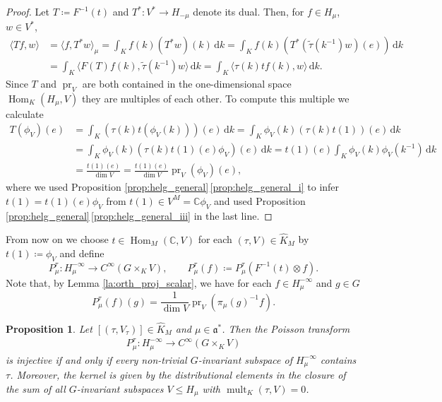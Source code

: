 \documentclass[JEP,XML,SOM,NoFloatCountersInSection,Unicode,published]{cedram}
\newtheorem{proposition}[theorem]{Proposition}
\theoremstyle{definition}
\newcommand{\mf}[1]{\ensuremath{\mathfrak{#1}}}
\newcommand{\on}[1]{\ensuremath{\operatorname{#1}}}
\newcommand{\Hom}[3]{\ensuremath{\on{Hom}_{#1}(#2,#3)}}
\newcommand{\C}{\ensuremath{\mathbb{C}}}
\newcommand{\pst}[1]{\ensuremath{H_{#1}}}
\newcommand{\pstd}[1]{\ensuremath{H_{#1}^{-\infty}}}
\newcommand{\intd}{\ensuremath{\,\mathrm{d}}}
\begin{document}
\begin{proof}
Let $T\coloneqq F^{-1}(t)$ and $T^*\colon V^*\to\pst{-\mu}$ denote its dual. Then, for $f\in\pst{\mu}$, \hbox{$w\in V^*$},
\begin{align*}
\langle Tf,w\rangle&=\langle f,T^*w\rangle_{\mu}=\int_Kf(k)(T^*w)(k)\intd k=\int_Kf(k)(T^*(\tilde\tau(k^{-1})w)(e))\intd k\\
&=\int_K\langle F(T)f(k),\tilde\tau(k^{-1})w\rangle\intd k=\int_K\langle\tau(k)tf(k),w\rangle\intd k.
\end{align*}
Since $T$ and $\on{pr}_V$ are both contained in the one-dimensional space $\Hom{K}{\pst{\mu}}{V}$ they are multiples of each other. To compute this multiple we calculate
\begin{align*}
T(\phi_V)(e)&=\int_K(\tau(k)t(\phi_V(k)))(e)\intd k=\int_K\phi_V(k)(\tau(k)t(1))(e)\intd k\\
&=\int_K\phi_V(k)(\tau(k)t(1)(e)\phi_V)(e)\intd k=t(1)(e)\int_K\phi_V(k)\phi_V(k^{-1})\intd k\\
&=\frac{t(1)(e)}{\dim V}=\frac{t(1)(e)}{\dim V}\on{pr}_V(\phi_V)(e),
\end{align*}
where we used Proposition \ref{prop:helg_general}\,\eqref{prop:helg_general_i} to infer $t(1)=t(1)(e)\phi_V$ from $t(1)\in V^M=\C\phi_V$ and used Proposition \ref{prop:helg_general}\,\eqref{prop:helg_general_iii} in the last line.
\end{proof}

From now on we choose $t\in\Hom{M}{\C}{V}$ for each $(\tau,V)\in\hat K_M$ by $t(1)\coloneqq\phi_V$ and define\vspace*{-3pt}
\[
P_{\mu}^\tau: \pstd{\mu}\to C^\infty(G\times_K V),\qquad P_{\mu}^\tau(f)\coloneqq P_{\mu}^\tau(F^{-1}(t)\otimes f).
\]
Note that, by Lemma \ref{la:orth_proj_scalar}, we have for each $f\in\pstd{\mu}$ and $g\in G$\vspace*{-3pt}
\begin{equation}\label{eq:Poisson_proj}
P_{\mu}^\tau(f)(g)=\frac{1}{\dim V}\on{pr}_V(\pi_\mu(g)^{-1}f).
\end{equation}

\begin{proposition}\label{prop:PoissonInjective}
Let $[(\tau, V_\tau)]\in\hat K_M$ and $\mu\in\mf a^*$. Then the Poisson transform\vspace*{-3pt}
\begin{align*}
P_{\mu}^\tau: \pstd{\mu}\to C^\infty(G\times_K V)
\end{align*}
is injective if and only if every non-trivial $G$-invariant subspace of $\pstd{\mu}$ contains $\tau$. Moreover, the kernel is given by the distributional elements in the closure of the sum of all $G$-invariant subspaces $V\leq\pst{\mu}$ with $\on{mult}_K(\tau, V)=0$.
\end{proposition}
\end{document}
